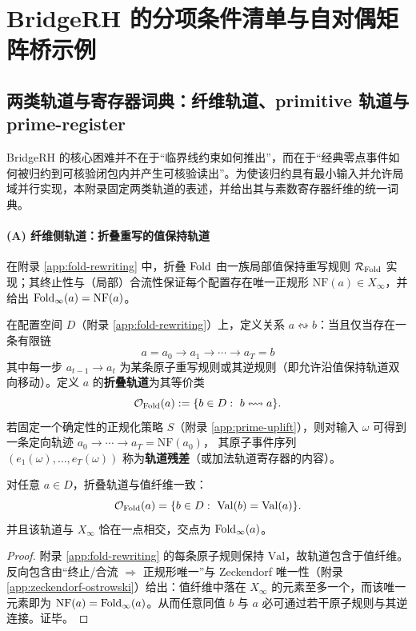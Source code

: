 \section{BridgeRH 的分项条件清单与自对偶矩阵桥示例}\label{app:bridge-rh-obligations}

\subsection{两类轨道与寄存器词典：纤维轨道、primitive 轨道与 prime-register}
\label{subsec:bridge-orbit-dictionary}
BridgeRH 的核心困难并不在于“临界线约束如何推出”，而在于“经典零点事件如何被归约到可核验闭包内并产生可核验读出”。为使该归约具有最小输入并允许局域并行实现，本附录固定两类轨道的表述，并给出其与素数寄存器纤维的统一词典。

\paragraph{(A) 纤维侧轨道：折叠重写的值保持轨道}
在附录 \ref{app:fold-rewriting} 中，折叠 $\mathrm{Fold}$ 由一族局部值保持重写规则 $\mathcal{R}_{\mathrm{Fold}}$ 实现；其终止性与（局部）合流性保证每个配置存在唯一正规形 $\mathrm{NF}(a)\in X_\infty$，并给出 $\mathrm{Fold}_\infty(a)=\mathrm{NF}(a)$。

\begin{definition}[折叠轨道与轨道残差]\label{def:fold-orbit-residual}
在配置空间 $D$（附录 \ref{app:fold-rewriting}）上，定义关系 $a\leftrightsquigarrow b$：当且仅当存在一条有限链
$$
a=a_0\to a_1\to\cdots\to a_T=b
$$
其中每一步 $a_{t-1}\to a_t$ 为某条原子重写规则或其逆规则（即允许沿值保持轨道双向移动）。定义 $a$ 的\textbf{折叠轨道}为其等价类
$$
\mathcal{O}_{\Fold}(a):=\{b\in D:\ b\leftrightsquigarrow a\}.
$$
若固定一个确定性的正规化策略 $S$（附录 \ref{app:prime-uplift}），则对输入 $\omega$ 可得到一条定向轨迹
$
a_0\to\cdots\to a_T=\mathrm{NF}(a_0)
$，
其原子事件序列 $(e_1(\omega),\dots,e_T(\omega))$ 称为\textbf{轨道残差}（或加法轨道寄存器的内容）。
\end{definition}

\begin{proposition}\label{prop:fold-orbit-transversal}
对任意 $a\in D$，折叠轨道与值纤维一致：
$$
\mathcal{O}_{\Fold}(a)=\{b\in D:\ \mathrm{Val}(b)=\mathrm{Val}(a)\}.
$$
并且该轨道与 $X_\infty$ 恰在一点相交，交点为 $\mathrm{Fold}_\infty(a)$。
\end{proposition}
\begin{proof}
附录 \ref{app:fold-rewriting} 的每条原子规则保持 $\mathrm{Val}$，故轨道包含于值纤维。反向包含由“终止/合流 $\Rightarrow$ 正规形唯一”与 Zeckendorf 唯一性（附录 \ref{app:zeckendorf-ostrowski}）给出：值纤维中落在 $X_\infty$ 的元素至多一个，而该唯一元素即为 $\mathrm{NF}(a)=\mathrm{Fold}_\infty(a)$。从而任意同值 $b$ 与 $a$ 必可通过若干原子规则与其逆连接。证毕。
\end{proof}

